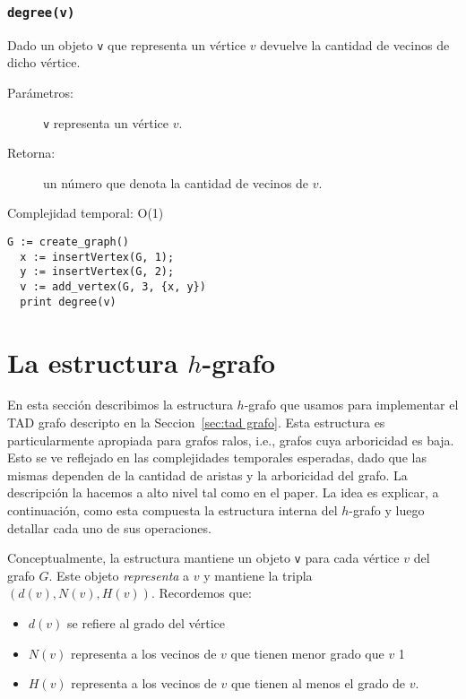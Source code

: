 \documentclass[%
    a4paper,%
    12pt,%
    twoside,%
    openright,%
    halfparskip,%
    cleardoubleempty,%
    bigheadings,%
    titlepage,%
    headsepline%
]{scrbook}
\makeatletter
\newcommand{\Code}[1]{\lstinline[basicstyle={\tt}]@#1@}
\makeatother
\begin{document}
\subsection{\Code{degree(v)}}
\label{sec:tad grafo:degree}

Dado un objeto \Code{v} que representa un vértice $v$ devuelve la cantidad de vecinos de dicho vértice. 

\begin{description}
  \item [Parámetros:] \Code{v} representa un vértice $v$.
  \item [Retorna:] un número que denota la cantidad de vecinos de $v$.
  \item [Complejidad temporal: O(1)]
\end{description}


\begin{lstlisting}[caption={Ejemplo de uso de degree. El código crea un grafo $G$ con el vértice 1, el vértice 2 y el vértice 3. Luego se imprime el grado de $v$, es decir, ``2''.},gobble=2,float=ht,label={lst:pseudo:degree},emph={degree}]
  G := create_graph()
  x := insertVertex(G, 1);
  y := insertVertex(G, 2);
  v := add_vertex(G, 3, {x, y})
  print degree(v)
\end{lstlisting}


\chapter{La estructura $h$-grafo}
\label{sec:h-grafo}

En esta sección describimos la estructura $h$-grafo que usamos para implementar el TAD grafo descripto en la Seccion~\ref{sec:tad grafo}.  Esta estructura es particularmente apropiada para grafos ralos, i.e., grafos cuya arboricidad es baja.  Esto se ve reflejado en  las complejidades temporales esperadas, dado que las mismas dependen de la cantidad de aristas y la arboricidad del grafo.  La descripción la hacemos a alto nivel tal como en el paper.  La idea es explicar, a continuación, como esta compuesta la estructura interna del $h$-grafo y luego detallar cada uno de sus operaciones.


Conceptualmente, la estructura mantiene un objeto \texttt{v} para cada vértice $v$ del grafo $G$.  Este objeto \emph{representa} a $v$ y mantiene la tripla $(d(v), N(v), H(v))$.  Recordemos que:   
\begin{itemize}
\item $d(v)$ se refiere al grado del vértice
\item $N(v)$ representa a los vecinos de $v$ que tienen menor grado que $v$
1\item $H(v)$ representa a los vecinos de $v$ que tienen al menos el grado de $v$.
\end{itemize}
\end{document}
